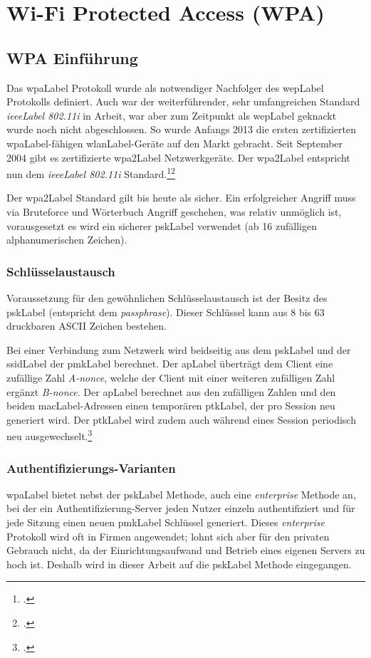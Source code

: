 \chapter{Wi-Fi Protected Access (WPA)}
\label{ch:wpa}


\section{WPA Einführung}

Das \gls{wpaLabel} Protokoll wurde als notwendiger Nachfolger des \gls{wepLabel} Protokolls definiert.
Auch war der weiterführender, sehr umfangreichen Standard \textit{\gls{ieeeLabel} 802.11i} in Arbeit, war aber zum Zeitpunkt als \gls{wepLabel} geknackt wurde noch nicht abgeschlossen. So wurde Anfangs 2013 die ersten zertifizierten \gls{wpaLabel}-fähigen \gls{wlanLabel}-Geräte auf den Markt gebracht.
Seit September 2004 gibt es zertifizierte \gls{wpa2Label} Netzwerkgeräte. Der \gls{wpa2Label} entspricht nun dem \textit{\gls{ieeeLabel} 802.11i} Standard.\footcite{Wi-Fi_Protected_Access__Wikipedia_2015-04-10}\footcite{WPA2__Wikipedia_2015-04-10}

Der \gls{wpa2Label} Standard gilt bis heute als sicher.
Ein erfolgreicher Angriff muss via Bruteforce und Wörterbuch Angriff geschehen, was relativ unmöglich ist, vorausgesetzt es wird ein sicherer \gls{pskLabel} verwendet (ab 16 zufälligen alphanumerischen Zeichen).

\subsection{Schlüsselaustausch}
Voraussetzung für den gewöhnlichen Schlüsselaustausch ist der Besitz des \gls{pskLabel} (entspricht dem \textit{passphrase}).
Dieser Schlüssel kann aus 8 bis 63 druckbaren ASCII Zeichen bestehen.

Bei einer Verbindung zum Netzwerk wird beidseitig aus dem \gls{pskLabel} und der \gls{ssidLabel} der \gls{pmkLabel} berechnet.
Der \gls{apLabel} überträgt dem Client eine zufällige Zahl \textit{A-nonce}, welche der Client mit einer weiteren zufälligen Zahl ergänzt \textit{B-nonce}.
Der \gls{apLabel} berechnet aus den zufälligen Zahlen und den beiden \gls{macLabel}-Adressen einen temporären \gls{ptkLabel}, der pro Session neu generiert wird. Der \gls{ptkLabel} wird zudem auch während eines Session periodisch neu ausgewechselt.\footcite[][40f.]{WrightCache201503}

\subsection{Authentifizierungs-Varianten}
\gls{wpaLabel} bietet nebst der \gls{pskLabel} Methode, auch eine \textit{enterprise} Methode an, bei der ein Authentifizierung-Server jeden Nutzer einzeln authentifiziert und für jede Sitzung einen neuen \gls{pmkLabel} Schlüssel generiert.
Dieses \textit{enterprise} Protokoll wird oft in Firmen angewendet; lohnt sich aber für den privaten Gebrauch nicht, da der Einrichtungsaufwand und Betrieb eines eigenen Servers zu hoch ist.
Deshalb wird in dieser Arbeit auf die \gls{pskLabel} Methode eingegangen.

